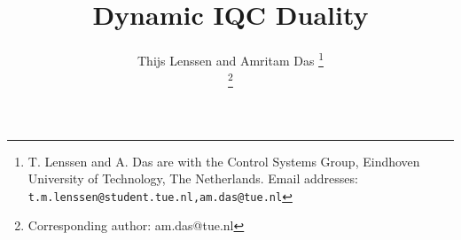 \documentclass[journal,10pt,onecolumn,twoside,a4paper]{IEEEtran}
\begin{document}
\title{Dynamic IQC Duality}


\author{Thijs Lenssen and Amritam Das%
\thanks{T. Lenssen and A. Das are with the Control Systems Group, Eindhoven University of Technology, The Netherlands. Email addresses: \small{\tt\small{t.m.lenssen@student.tue.nl,am.das@tue.nl}}}

\thanks{Corresponding author: am.das@tue.nl}}%
\end{document}
